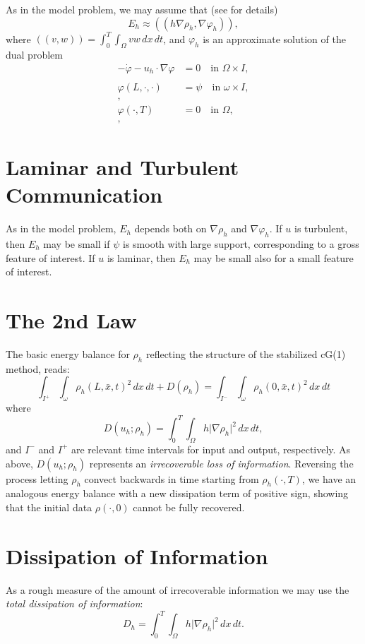 As in the model problem, we may assume that
(see \cite{ambsflow} for details)
\[
E_h\approx ((h\nabla \rho_h,\nabla \varphi_h )),
\]
where $((v,w))=\int_0^T\int_\Omega vw\, dx\, dt$, and
$\varphi_h$ is an approximate solution of the dual problem
\[
\begin{split}
-\dot\varphi -u_h\cdot\nabla \varphi &=0\quad \mbox{in } \Omega\times I,\\\\
\varphi (L,\cdot ,\cdot)&=\psi \quad \mbox{in } \omega\times I,\\ ,\\
\varphi (\cdot ,T)&=0 \quad \mbox{in } \Omega,\\,
\end{split}
\]


\section{Laminar and Turbulent Communication}
As in the model problem, $E_h$ depends both on 
$\nabla\rho_h$ and $\nabla\varphi_h $.
If $u$ is turbulent, then $E_h$ may be small if $\psi$ is smooth with
large support, corresponding to a gross feature of interest.
If $u$ is laminar, then $E_h$ may be small also 
for a small feature of interest.

\section{The 2nd Law}

The basic energy balance for $\rho_h$ reflecting the structure
of the stabilized cG(1) method, reads:
\[
\int_{I^+}\int_\omega\rho_h (L,\bar x,t)^2\, dx\, dt+
D(\rho_h)=
\int_{I^-}\int_\omega\rho_h (0,\bar x,t)^2\, dx\, dt 
\]
where
\[
D(u_h;\rho_h) =\int_0^T\int_\Omega h\vert\nabla\rho_h\vert^2\, dx\, dt,
\]
and  $I^-$ and $I^+$ are relevant time intervals for input and output,
respectively.
As above, $D(u_h;\rho_h)$ represents 
an \emph{irrecoverable loss of information}. Reversing the
process letting $\rho_h$ convect backwards in time starting from
$\rho_h(\cdot ,T)$, we have an analogous energy balance
with a new dissipation term of positive sign, showing that
the initial data $\rho (\cdot ,0)$ cannot be fully recovered.
 

\section{Dissipation of Information}
As a rough measure of the amount of irrecoverable information  
we may use the \emph{total dissipation of information}:
\[
D_h=\int_0^T\int_\Omega h\vert\nabla\rho_h\vert^2\, dx\, dt.
\]
 


